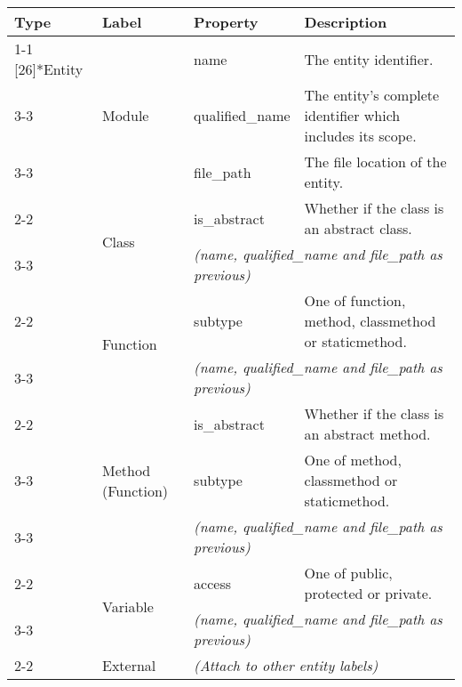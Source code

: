 \begin{tabularx}{\textwidth}{p{1.8cm}llX}
\toprule
\textbf{Type} & \textbf{Label} & \textbf{Property} & \textbf{Description} \\
\cmidrule{1-1}\cmidrule{2-2}\cmidrule{3-3}\cmidrule{4-4}
\multirow{13}[26]{*}{Entity} & \multirow{3}[6]{*}{\textsf{Module}} & \textsf{name} & The entity identifier. \\
\cmidrule{3-3}\cmidrule{4-4}
 &  & \textsf{qualified\_\textsf{name}} & The entity's complete identifier which includes its scope. \\
\cmidrule{3-3}\cmidrule{4-4}
 &  & \textsf{file\_path} & The file location of the entity. \\
\cmidrule{2-2}\cmidrule{3-3}\cmidrule{4-4}
 & \multirow{2}[4]{*}{\textsf{Class}} & \textsf{is\_abstract} & Whether if the class is an abstract class. \\
\cmidrule{3-3}\cmidrule{4-4}
 &  & \multicolumn{2}{l}{\textit{(\textsf{name}, \textsf{qualified\_\textsf{name}} and \textsf{file\_path} as previous)}} \\
\cmidrule{2-2}\cmidrule{3-3}\cmidrule{4-4}
 & \multirow{2}[4]{*}{\textsf{Function}} & \textsf{subtype} & One of \textsf{function}, \textsf{method}, \textsf{class\textsf{method}} or \textsf{static\textsf{method}}. \\
\cmidrule{3-3}\cmidrule{4-4}
 &  & \multicolumn{2}{l}{\textit{(\textsf{name}, \textsf{qualified\_\textsf{name}} and \textsf{file\_path} as previous)}} \\
\cmidrule{2-2}\cmidrule{3-3}\cmidrule{4-4}
 & \multirow{3}[6]{*}{\textsf{Method} (\textsf{Function})} & \textsf{is\_abstract} & Whether if the class is an abstract \textsf{method}. \\
\cmidrule{3-3}\cmidrule{4-4}
 &  & \textsf{subtype} & One of \textsf{method}, \textsf{class\textsf{method}} or \textsf{static\textsf{method}}. \\
\cmidrule{3-3}\cmidrule{4-4}
 &  & \multicolumn{2}{l}{\textit{(\textsf{name}, \textsf{qualified\_\textsf{name}} and \textsf{file\_path} as previous)}} \\
\cmidrule{2-2}\cmidrule{3-3}\cmidrule{4-4}
 & \multirow{2}[4]{*}{\textsf{Variable}} & \textsf{access} & One of \textsf{public}, \textsf{protected} or \textsf{private}. \\
\cmidrule{3-3}\cmidrule{4-4}
 &  & \multicolumn{2}{l}{\textit{(\textsf{name}, \textsf{qualified\_\textsf{name}} and \textsf{file\_path} as previous)}} \\
\cmidrule{2-2}\cmidrule{3-3}\cmidrule{4-4}
 & External & \multicolumn{2}{l}{\textit{(Attach to other entity labels)}} \\
\bottomrule
\end{tabularx}

